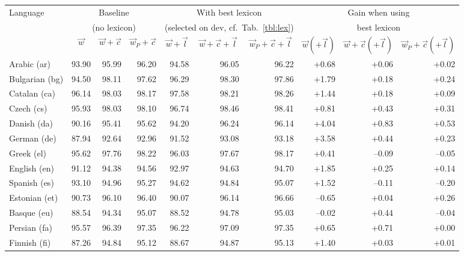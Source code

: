 \documentclass[11pt,a4paper]{article}
\begin{document}
\begin{table}[t]
\centering\scriptsize
\begin{tabular}{l|rrr|rrr|rrr}
\toprule
Language & \multicolumn{3}{c|}{Baseline} & \multicolumn{3}{c|}{With best lexicon} & \multicolumn{3}{c}{Gain when using} \\
 & \multicolumn{3}{c|}{(no lexicon)} & \multicolumn{3}{c|}{(selected on dev, cf.~Tab.~\ref{tbl:lex})} & \multicolumn{3}{c}{best lexicon} \\
 & \multicolumn{1}{c}{$\vec{w}$} & \multicolumn{1}{c}{$\vec{w}+\vec{c}$} & \multicolumn{1}{c|}{$\vec{w}_P+\vec{c}$} & \multicolumn{1}{c}{$\vec{w}+\vec{l}$} & \multicolumn{1}{c}{$\vec{w}+\vec{c}+\vec{l}$} & \multicolumn{1}{c|}{$\vec{w}_P+\vec{c}+\vec{l}$} & \multicolumn{1}{c}{$\vec{w}(+\vec{l})$} & \multicolumn{1}{c}{$\vec{w}+\vec{c}(+\vec{l})$} & \multicolumn{1}{c}{$\vec{w}_P+\vec{c}(+\vec{l})$} \\
\midrule
Arabic (ar) & 93.90 & 95.99 & 96.20 & 94.58 & 96.05 & 96.22 & +0.68 & +0.06 & +0.02\\
Bulgarian (bg) & 94.50 & 98.11 & 97.62 & 96.29 & 98.30 & 97.86 & +1.79 & +0.18 & +0.24\\
Catalan (ca) & 96.14 & 98.03 & 98.17 & 97.58 & 98.21 & 98.26 & +1.44 & +0.18 & +0.09\\
Czech (cs) & 95.93 & 98.03 & 98.10 & 96.74 & 98.46 & 98.41 & +0.81 & +0.43 & +0.31\\
Danish (da) & 90.16 & 95.41 & 95.62 & 94.20 & 96.24 & 96.14 & +4.04 & +0.83 & +0.53\\
German (de) & 87.94 & 92.64 & 92.96 & 91.52 & 93.08 & 93.18 & +3.58 & +0.44 & +0.23\\
Greek (el) & 95.62 & 97.76 & 98.22 & 96.03 & 97.67 & 98.17 & +0.41 & --0.09 & --0.05\\
English (en) & 91.12 & 94.38 & 94.56 & 92.97 & 94.63 & 94.70 & +1.85 & +0.25 & +0.14\\
Spanish (es) & 93.10 & 94.96 & 95.27 & 94.62 & 94.84 & 95.07 & +1.52 & --0.11 & --0.20\\
Estonian (et) & 90.73 & 96.10 & 96.40 & 90.07 & 96.14 & 96.66 & --0.65 & +0.04 & +0.26\\
Basque (eu) & 88.54 & 94.34 & 95.07 & 88.52 & 94.78 & 95.03 & --0.02 & +0.44 & --0.04\\
Persian (fa) & 95.57 & 96.39 & 97.35 & 96.22 & 97.09 & 97.35 & +0.65 & +0.71 & +0.00\\
Finnish (fi) & 87.26 & 94.84 & 95.12 & 88.67 & 94.87 & 95.13 & +1.40 & +0.03 & +0.01\\

\end{tabular}
\end{table}
\end{document}
